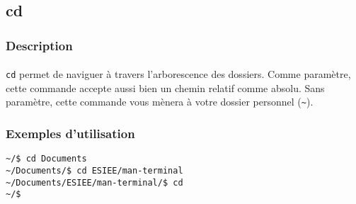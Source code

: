 \subsection{cd}
\subsubsection*{Description}

\paragraph{} \texttt{cd} permet de naviguer à travers l'arborescence des
dossiers. Comme paramètre, cette commande accepte aussi bien un chemin relatif
comme absolu. Sans paramètre, cette commande vous mènera à votre dossier
personnel (\texttt{\~}).

\subsubsection*{Exemples d'utilisation}

\begin{lstlisting}
~/$ cd Documents
~/Documents/$ cd ESIEE/man-terminal
~/Documents/ESIEE/man-terminal/$ cd
~/$
\end{lstlisting}
